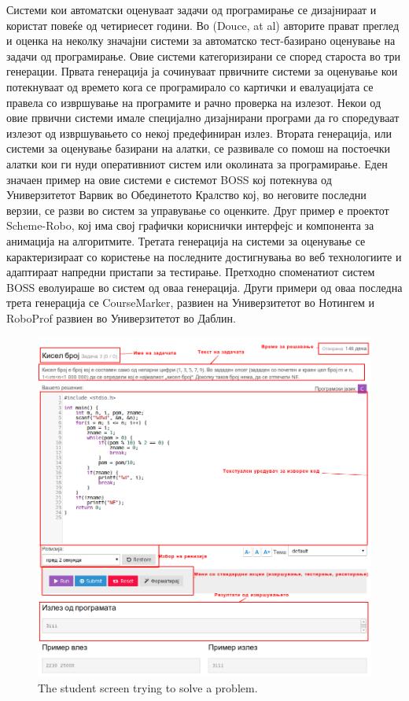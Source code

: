 \documentclass[a4paper,twocolumn]{article}
\begin{document}
Системи кои автоматски оценуваат задачи од програмирање се дизајнираат и
користат повеќе од четириесет години. Во (Douce, at al)  авторите прават преглед
и оценка на неколку значајни системи за автоматско тест-базирано оценување на
задачи од програмирање. Овие системи категоризирани се според староста во три
генерации. Првата генерација ја сочинуваат првичните системи за оценување кои
потекнуваат од времето кога се програмирало со картички и евалуацијата се
правела со извршување на програмите и рачно проверка на излезот. Некои од овие
првични системи имале специјално дизајнирани програми да го споредуваат излезот
од извршувањето со некој предефиниран излез. Втората генерација, или системи за
оценување базирани на алатки, се развивале со помош на постоечки алатки кои ги
нуди оперативниот систем или околината за програмирање. Еден значаен пример на
овие системи е системот BOSS кој потекнува од Универзитетот Варвик во
Обединетото Кралство кој, во неговите последни верзии, се разви во систем за
управување со оценките. Друг пример е проектот Scheme-Robo, кој има свој
графички кориснички интерфејс и компонента за анимација на алгоритмите. Третата
генерација на системи за оценување се карактеризираат со користење на последните
достигнувања во веб технологиите и адаптираат напредни пристапи за тестирање.
Претходно споменатиот систем BOSS еволуираше во систем од оваа генерација. Други
примери од оваа последна трета генерација се CourseMarker, развиен на
Универзитетот во Нотингем и RoboProf развиен во Универзитетот во Даблин.


\begin{figure}[ht]
\centering
\includegraphics[width=.99\textwidth]{images/integrated_code_view}
\caption{The student screen trying to solve a problem.}
\label{fig:student_screen}
\end{figure}
\end{document}
